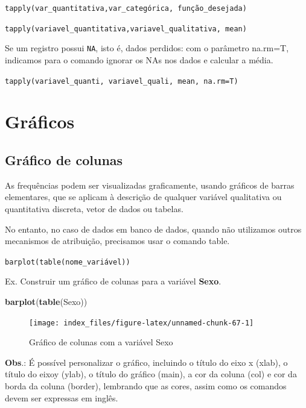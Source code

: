 \documentclass[12pt,brazil,oneside]{book}
\newenvironment{Shaded}{\begin{snugshade}}{\end{snugshade}}
\newcommand{\KeywordTok}[1]{\textcolor[rgb]{0.13,0.29,0.53}{\textbf{#1}}}
\newcommand{\NormalTok}[1]{#1}
\begin{document}
\texttt{tapply(var\_quantitativa,var\_categórica,\ função\_desejada)}

\texttt{tapply(variavel\_quantitativa,variavel\_qualitativa,\ mean)}

Se um registro possui \texttt{NA}, isto é, dados perdidos: com o
parâmetro na.rm=T, indicamos para o comando ignorar os NAs nos dados e
calcular a média.

\texttt{tapply(variavel\_quanti,\ variavel\_quali,\ mean,\ na.rm=T)}

\hypertarget{graficos}{%
\section{Gráficos}\label{graficos}}

\hypertarget{grafico-de-colunas}{%
\subsection{Gráfico de colunas}\label{grafico-de-colunas}}

As frequências podem ser visualizadas graficamente, usando gráficos de
barras elementares, que se aplicam à descrição de qualquer variável
qualitativa ou quantitativa discreta, vetor de dados ou tabelas.

No entanto, no caso de dados em banco de dados, quando não utilizamos
outros mecanismos de atribuição, precisamos usar o comando table.

\texttt{barplot(table(nome\_variável))}

Ex. Construir um gráfico de colunas para a variável \textbf{Sexo}.

\begin{Shaded}
\begin{Highlighting}[]
\KeywordTok{barplot}\NormalTok{(}\KeywordTok{table}\NormalTok{(Sexo))}
\end{Highlighting}
\end{Shaded}

\begin{figure}[H]

{\centering \texttt{[image: index\_files/figure-latex/unnamed-chunk-67-1]} 

}

\caption{Gráfico de colunas com a variável Sexo}\label{fig:unnamed-chunk-67}
\end{figure}

\textbf{Obs}.: É possível personalizar o gráfico, incluindo o título do
eixo x (xlab), o título do eixoy (ylab), o título do gráfico (main), a
cor da coluna (col) e cor da borda da coluna (border), lembrando que as
cores, assim como os comandos devem ser expressas em inglês.
\end{document}
